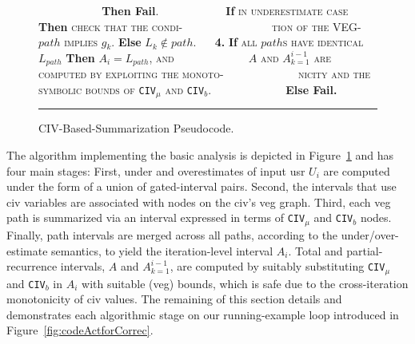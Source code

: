 \documentclass{sig-alternate}
\begin{document}
\begin{figure}[t]
\begin{small}
$\mbox{ }\mbox{ }\mbox{ }\mbox{ }\mbox{ }\mbox{ }\mbox{ }\mbox{ }$
            {\bf Then Fail}.\vspace{1.5ex} \newline
$\mbox{ }\mbox{ }\mbox{ }\mbox{ }\mbox{ }\mbox{ }\mbox{ }\mbox{ }$
            {\bf If} \textsc{in underestimate case} {\bf Then} \textsc{check that the condi-}
$\mbox{ }\mbox{ }\mbox{ }\mbox{ }\mbox{ }\mbox{ }\mbox{ }\mbox{ }\mbox{ }\mbox{ }\mbox{ }$
\textsc{tion of the VEG-$path$ implies $g_k$}. {\bf Else} $L_k \not\in path$.\vspace{2ex}\newline
$\mbox{ }\mbox{ }${\bf4.} {\bf If} \textsc{all $path$s have identical $L_{path}$} {\bf Then} $A_i = L_{path}$, \textsc{and}\newline 
$\mbox{ }\mbox{ }\mbox{ }\mbox{ }\mbox{ }\mbox{ }\mbox{ }\mbox{ }\mbox{ }$
            \textsc{$A$ and $A_{k=1}^{i-1}$ are computed by exploiting the monoto-}\newline 
$\mbox{ }\mbox{ }\mbox{ }\mbox{ }\mbox{ }\mbox{ }\mbox{ }\mbox{ }\mbox{ }$
\textsc{nicity and the symbolic bounds of {\tt CIV$_\mu$} {\sc and} {\tt CIV$_b$}.}\newline
$\mbox{ }\mbox{ }\mbox{ }\mbox{ }\mbox{ }\mbox{ }\mbox{ }\mbox{ }\mbox{ }$ {\bf Else Fail.}\vspace{1ex}
\end{small}
\hrule
\caption{ CIV-Based-Summarization Pseudocode.}
\label{fig:BasicTechnique} %
\end{figure}


The algorithm implementing the basic analysis is depicted in 
Figure~\ref{fig:BasicTechnique} and has four main stages: 
First, under and overestimates of input {\sc usr} $U_i$ are 
computed under the form of a union of gated-interval pairs.   %
Second, the intervals that use {\sc civ} variables are 
associated with nodes on the {\sc civ}'s {\sc veg} graph. %
Third, each {\sc veg} path is summarized via an interval expressed 
in terms of {\tt CIV$_\mu$} and {\tt CIV$_b$} nodes.\\
\noindent Finally, path intervals are merged across all paths, according to 
the under/over-estimate semantics, to yield the iteration-level interval $A_i$.
Total and partial-recurrence intervals, $A$ and $A_{k=1}^{i-1}$, 
are computed by suitably substituting {\tt CIV$_\mu$} and 
{\tt CIV$_b$} in $A_i$ with suitable ({\sc veg}) bounds,
which is safe due to the cross-iteration monotonicity of {\sc civ} values.
The remaining of this section details and demonstrates each algorithmic stage
on our running-example loop introduced in Figure~\ref{fig:codeActforCorrec}.
\end{document}
